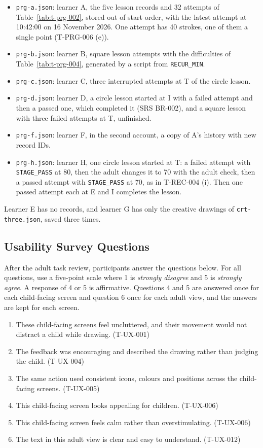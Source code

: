 \documentclass[12pt, titlepage]{article}
\begin{document}
\begin{itemize}
\item \texttt{prg-\allowbreak{}a.json}: learner A, the five lesson records
and 32 attempts of Table~\ref{tab:t-prg-002}, stored out of start order,
with the latest attempt at 10:42:00 on 16 November 2026. One attempt has 40
strokes, one of them a single point (T-PRG-006 (e)).
\item \texttt{prg-\allowbreak{}b.json}: learner B, square lesson attempts
with the difficulties of Table~\ref{tab:t-prg-004}, generated by a script
from \texttt{RECUR\_MIN}.
\item \texttt{prg-\allowbreak{}c.json}: learner C, three interrupted
attempts at T of the circle lesson.
\item \texttt{prg-\allowbreak{}d.json}: learner D, a circle lesson started
at I with a failed attempt and then a passed one, which completed it
(SRS BR-002), and a square lesson with three failed
attempts at T, unfinished.
\item \texttt{prg-\allowbreak{}f.json}: learner F, in the second account, a
copy of A's history with new record IDs.
\item \texttt{prg-\allowbreak{}h.json}: learner H, one circle lesson
started at T: a failed attempt with \texttt{STAGE\_PASS} at 80, then the
adult changes it to 70 with the adult check, then a passed attempt with
\texttt{STAGE\_PASS} at 70, as in T-REC-004 (i). Then one passed
attempt each at E and I completes the lesson.
\end{itemize}
Learner E has no records, and learner G has only the creative drawings of
\texttt{crt-\allowbreak{}three.json}, saved three times.

\subsection{Usability Survey Questions}
\label{sec:usability-survey}

After the adult task review, participants answer the questions below.
For all questions, use a five-point scale where 1 is \emph{strongly
disagree} and 5 is \emph{strongly agree}. A response of 4 or 5 is
affirmative. Questions 4 and 5 are answered once for each child-facing screen and
question 6 once for each adult view, and the answers are kept for each screen.
\begin{enumerate}
  \item These child-facing screens feel uncluttered, and their movement would
    not distract a child while drawing. (T-UX-001)
  \item The feedback was encouraging and described the drawing rather than
    judging the child. (T-UX-004)
  \item The same action used consistent icons, colours and positions across
    the child-facing screens. (T-UX-005)
  \item This child-facing screen looks appealing for children.
    (T-UX-006)
  \item This child-facing screen feels calm rather than overstimulating.
    (T-UX-006)
  \item The text in this adult view is clear and easy to understand.
    (T-UX-012)
\end{enumerate}
\end{document}
